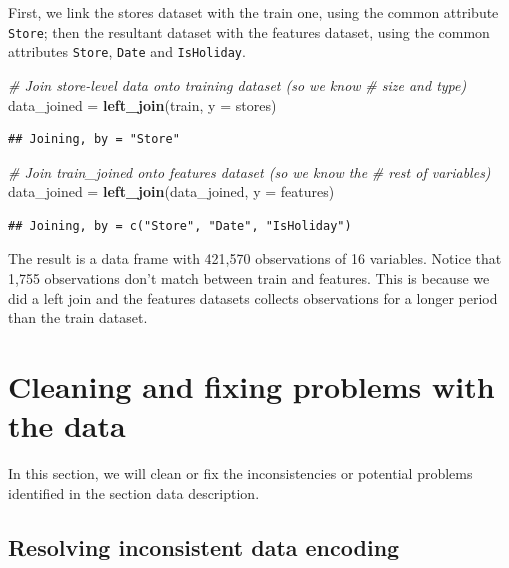 \documentclass[11pt,]{article}
\newenvironment{Shaded}{\begin{snugshade}}{\end{snugshade}}
\newcommand{\KeywordTok}[1]{\textcolor[rgb]{0.13,0.29,0.53}{\textbf{{#1}}}}
\newcommand{\DataTypeTok}[1]{\textcolor[rgb]{0.13,0.29,0.53}{{#1}}}
\newcommand{\StringTok}[1]{\textcolor[rgb]{0.31,0.60,0.02}{{#1}}}
\newcommand{\CommentTok}[1]{\textcolor[rgb]{0.56,0.35,0.01}{\textit{{#1}}}}
\newcommand{\NormalTok}[1]{{#1}}
\begin{document}
First, we link the stores dataset with the train one, using the common
attribute \texttt{Store}; then the resultant dataset with the features
dataset, using the common attributes \texttt{Store}, \texttt{Date} and
\texttt{IsHoliday}.

\begin{Shaded}
\begin{Highlighting}[]
\CommentTok{# Join store-level data onto training dataset (so we know}
\CommentTok{# size and type)}
\NormalTok{data_joined =}\StringTok{ }\KeywordTok{left_join}\NormalTok{(train, }\DataTypeTok{y =} \NormalTok{stores)}
\end{Highlighting}
\end{Shaded}

\begin{verbatim}
## Joining, by = "Store"
\end{verbatim}

\begin{Shaded}
\begin{Highlighting}[]
\CommentTok{# Join train_joined onto features dataset (so we know the}
\CommentTok{# rest of variables)}
\NormalTok{data_joined =}\StringTok{ }\KeywordTok{left_join}\NormalTok{(data_joined, }\DataTypeTok{y =} \NormalTok{features)}
\end{Highlighting}
\end{Shaded}

\begin{verbatim}
## Joining, by = c("Store", "Date", "IsHoliday")
\end{verbatim}

The result is a data frame with 421,570 observations of 16 variables.
Notice that 1,755 observations don't match between train and features.
This is because we did a left join and the features datasets collects
observations for a longer period than the train dataset.

\section{Cleaning and fixing problems with the
data}\label{cleaning-and-fixing-problems-with-the-data}

In this section, we will clean or fix the inconsistencies or potential
problems identified in the section data description.

\subsection{Resolving inconsistent data
encoding}\label{resolving-inconsistent-data-encoding}
\end{document}
